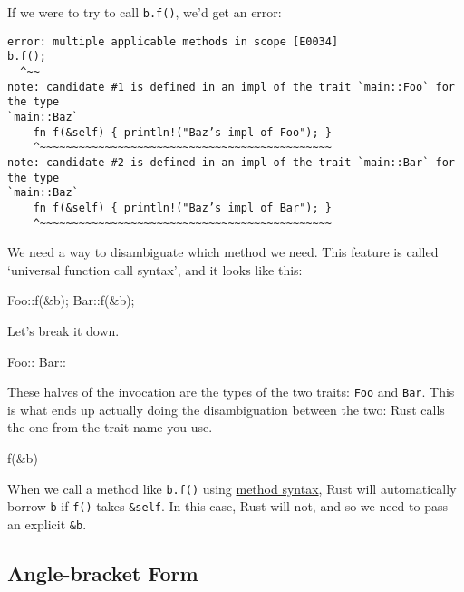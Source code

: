 \documentclass[a4paper,]{book}
\newenvironment{Shaded}{\begin{snugshade}}{\end{snugshade}}
\newcommand{\NormalTok}[1]{{#1}}
\begin{document}
If we were to try to call \texttt{b.f()}, we'd get an error:

\begin{verbatim}
error: multiple applicable methods in scope [E0034]
b.f();
  ^~~
note: candidate #1 is defined in an impl of the trait `main::Foo` for the type
`main::Baz`
    fn f(&self) { println!("Baz’s impl of Foo"); }
    ^~~~~~~~~~~~~~~~~~~~~~~~~~~~~~~~~~~~~~~~~~~~~~
note: candidate #2 is defined in an impl of the trait `main::Bar` for the type
`main::Baz`
    fn f(&self) { println!("Baz’s impl of Bar"); }
    ^~~~~~~~~~~~~~~~~~~~~~~~~~~~~~~~~~~~~~~~~~~~~~
\end{verbatim}

We need a way to disambiguate which method we need. This feature is
called `universal function call syntax', and it looks like this:

\begin{Shaded}
\begin{Highlighting}[]
\NormalTok{Foo::f(&b);}
\NormalTok{Bar::f(&b);}
\end{Highlighting}
\end{Shaded}

Let's break it down.

\begin{Shaded}
\begin{Highlighting}[]
\NormalTok{Foo::}
\NormalTok{Bar::}
\end{Highlighting}
\end{Shaded}

These halves of the invocation are the types of the two traits:
\texttt{Foo} and \texttt{Bar}. This is what ends up actually doing the
disambiguation between the two: Rust calls the one from the trait name
you use.

\begin{Shaded}
\begin{Highlighting}[]
\NormalTok{f(&b)}
\end{Highlighting}
\end{Shaded}

When we call a method like \texttt{b.f()} using
\protect\hyperlink{sec--method-syntax}{method syntax}, Rust will
automatically borrow \texttt{b} if \texttt{f()} takes \texttt{\&self}.
In this case, Rust will not, and so we need to pass an explicit
\texttt{\&b}.

\subsection{Angle-bracket Form}\label{angle-bracket-form}
\end{document}
